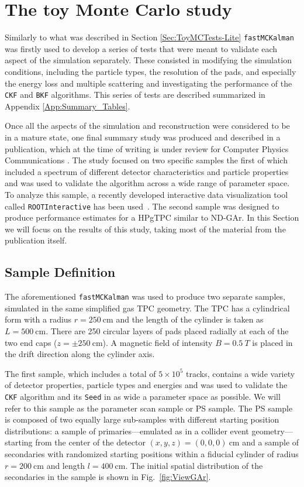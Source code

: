 \section{The toy Monte Carlo study}
\label{Sec:ToyMCStudy_GAr}

Similarly to what was described in Section \ref{Sec:ToyMCTests-Lite} \texttt{fastMCKalman} was firstly used to develop a series of tests that were meant to validate each aspect of the simulation separately. These consisted in modifying the simulation conditions, including the particle types, the resolution of the pads, and especially the energy loss and multiple scattering and investigating the performance of the \texttt{CKF} and \texttt{BKF} algorithms. This series of tests are described summarized in Appendix \ref{App:Summary_Tables}. 

Once all the aspects of the simulation and reconstruction were considered to be in a mature state, one final summary study was produced and described in a publication, which at the time of writing is under review for Computer Physics Communications \cite{Battisti:2024nqq}. The study focused on two specific samples the first of which included a spectrum of different detector characteristics and particle properties and was used to validate the algorithm across a wide range of parameter space. To analyze this sample, a recently developed interactive data visualization tool called \texttt{ROOTInteractive} has been used~\cite{RootInt}. The second sample was designed to produce performance estimates for a HPgTPC similar to ND-GAr. In this Section we will focus on the results of this study, taking most of the material from the publication itself.
\subsection{Sample Definition}
\label{sec:Sample_Definition}
The aforementioned \texttt{fastMCKalman} was used to produce two separate samples, simulated in the same simplified gas TPC geometry. The TPC has a cylindrical form with a radius $r=250 \ \text{cm}$ and the length of the cylinder is taken as $L=500 \ \text{cm}$. There are 250 circular layers of pads placed radially at each of the two end caps ($z=\pm250~\textrm{cm}$). A magnetic field of intensity $B=0.5 \ T$ is placed in the drift direction along the cylinder axis. 

The first sample, which includes a total of $5\times10^5$ tracks, contains a wide variety of detector properties, particle types and energies and was used to validate the \texttt{CKF} algorithm and its \texttt{Seed} in as wide a parameter space as possible. We will refer to this sample as the parameter scan sample or PS sample. The PS sample is composed of two equally large sub-samples with different starting position distributions: a sample of primaries---emulated as in a collider event geometry---starting from the center of the detector $(x,y,z)=(0,0,0)\ \text{cm}$ and a sample of secondaries with randomized starting positions within a fiducial cylinder of radius $r=200 \ \text{cm}$ and length $l = 400 \ \text{cm}$. The initial spatial distribution of the secondaries in the sample is shown in Fig.~\ref{fig:ViewGAr}.

